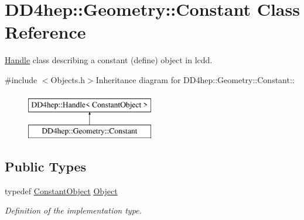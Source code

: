 \hypertarget{class_d_d4hep_1_1_geometry_1_1_constant}{
\section{DD4hep::Geometry::Constant Class Reference}
\label{class_d_d4hep_1_1_geometry_1_1_constant}
}


\hyperlink{class_d_d4hep_1_1_handle}{Handle} class describing a constant (define) object in lcdd.  


{\ttfamily \#include $<$Objects.h$>$}Inheritance diagram for DD4hep::Geometry::Constant::\begin{figure}[H]
\begin{center}
\leavevmode
\includegraphics[height=2cm]{class_d_d4hep_1_1_geometry_1_1_constant}
\end{center}
\end{figure}
\subsection*{Public Types}
\begin{DoxyCompactItemize}
\item 
typedef \hyperlink{class_d_d4hep_1_1_geometry_1_1_constant_object}{ConstantObject} \hyperlink{class_d_d4hep_1_1_geometry_1_1_constant_abff9d4c7bfbabd0f61a46253c4b79e70}{Object}
\begin{DoxyCompactList}\small\item\em Definition of the implementation type. \item\end{DoxyCompactList}\end{DoxyCompactItemize}

